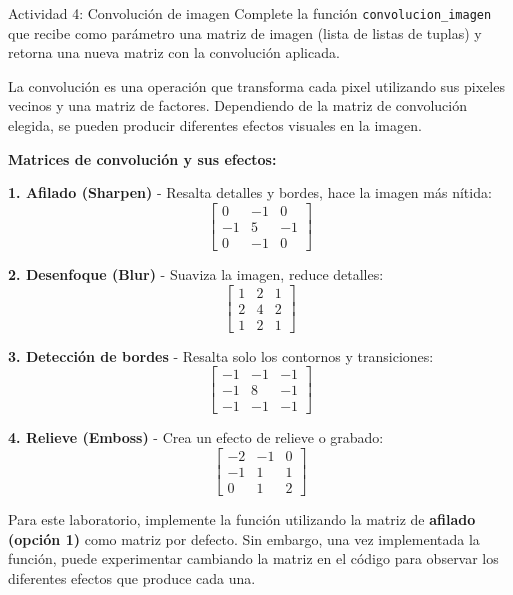 \documentclass{ip-lab}
\begin{document}
\pagebreak

\begin{sectionbox}{Actividad 4: Convolución de imagen}
  Complete la función \texttt{convolucion\_imagen} que recibe como parámetro una matriz de imagen (lista de listas de tuplas) y retorna una nueva matriz con la convolución aplicada.
  
  La convolución es una operación que transforma cada pixel utilizando sus pixeles vecinos y una matriz de factores. Dependiendo de la matriz de convolución elegida, se pueden producir diferentes efectos visuales en la imagen.
  
  \textbf{Matrices de convolución y sus efectos:}
  
  \textbf{1. Afilado (Sharpen)} - Resalta detalles y bordes, hace la imagen más nítida:
  \[
  \begin{bmatrix}
  0 & -1 & 0 \\
  -1 & 5 & -1 \\
  0 & -1 & 0
  \end{bmatrix}
  \]
  
  \textbf{2. Desenfoque (Blur)} - Suaviza la imagen, reduce detalles:
  \[
  \begin{bmatrix}
  1 & 2 & 1 \\
  2 & 4 & 2 \\
  1 & 2 & 1
  \end{bmatrix}
  \]
  
  \textbf{3. Detección de bordes} - Resalta solo los contornos y transiciones:
  \[
  \begin{bmatrix}
  -1 & -1 & -1 \\
  -1 & 8 & -1 \\
  -1 & -1 & -1
  \end{bmatrix}
  \]
  
  \textbf{4. Relieve (Emboss)} - Crea un efecto de relieve o grabado:
  \[
  \begin{bmatrix}
  -2 & -1 & 0 \\
  -1 & 1 & 1 \\
  0 & 1 & 2
  \end{bmatrix}
  \]
  
  Para este laboratorio, implemente la función utilizando la matriz de \textbf{afilado (opción 1)} como matriz por defecto. Sin embargo, una vez implementada la función, puede experimentar cambiando la matriz en el código para observar los diferentes efectos que produce cada una.
  

\end{sectionbox}
\end{document}
